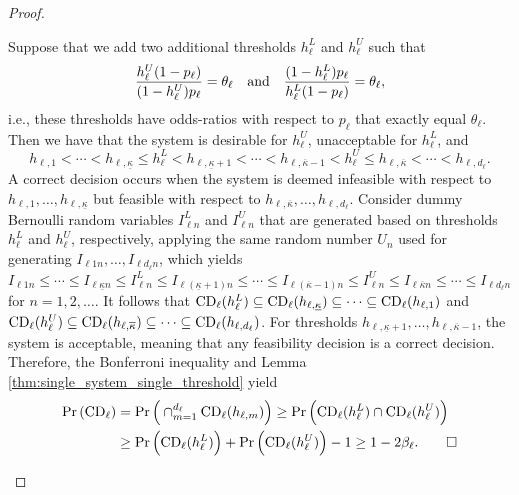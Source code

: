 \documentclass[11pt]{article}
\begin{document}
\begin{proof}
\begin{itemize}
Suppose that we add two additional thresholds $h_\ell^L$ and $h_\ell^U$ such that 
\begin{equation} 
\label{eqn:LBUB}
\frac{h_\ell^U (1-p_\ell)}{(1-h_\ell^U)p_\ell}  = \theta_\ell \quad \mbox{and} \quad {(1-h_\ell^L)p_\ell \over h_\ell^L(1-p_\ell)} =\theta_\ell,
\end{equation}
i.e., these thresholds have odds-ratios with respect to $p_\ell$ that exactly equal $\theta_\ell$. Then we have that the system is desirable for $h_\ell^U$, unacceptable for $h_\ell^L$, and 
\[
h_{\ell, 1} < \cdots < h_{\ell, \underline{\kappa}} \le h_\ell^L < h_{\ell,\underline{\kappa}+1} < \cdots < h_{\ell,\overline{\kappa}-1} < h_\ell^U \le h_{\ell,\overline{\kappa}} < \cdots < h_{\ell,d_\ell}.
\]
A correct decision occurs when the system is deemed infeasible with respect to $h_{\ell,1}, \ldots, h_{\ell,\underline{\kappa}}$ but feasible with respect to $h_{\ell,\overline{\kappa}}, \ldots, h_{\ell,d_\ell}$. Consider dummy Bernoulli random variables $I_{\ell n}^{L}$ and $I_{\ell n}^{U}$ that are generated based on thresholds $h_\ell^{L}$ and $h_\ell^{U}$, respectively, applying the same random number $U_{n}$ used for generating $I_{\ell 1n},\ldots, I_{\ell d_\ell n}$, which yields $I_{\ell 1n}\leq \cdots\leq I_{\ell \underline{\kappa} n}\leq I_{\ell n}^L\leq I_{\ell (\underline{\kappa}+1) n}\leq \cdots \leq I_{\ell (\overline{\kappa}-1) n}\leq I_{\ell n}^U \leq I_{\ell \overline{\kappa} n}\leq \cdots \leq I_{\ell d_\ell n}$ for $n=1,2,\ldots$.
It follows that ${\rm CD}_\ell(h_\ell^{L}) \subseteq {\rm CD}_\ell(h_{\ell, \underline{\kappa}})  \subseteq \cdots  \subseteq {\rm CD}_\ell(h_{\ell,1})$ and ${\rm CD}_\ell(h_\ell^{U}) \subseteq {\rm CD}_\ell(h_{\ell,\overline{\kappa}}) \subseteq \cdots \subseteq  {\rm CD}_{\ell}(h_{\ell,d_\ell})$. For thresholds $h_{\ell,\underline{\kappa}+1}, \ldots, h_{ \ell, \overline{\kappa}-1}$, the system is acceptable, meaning that any feasibility decision is a correct decision. Therefore, the Bonferroni inequality and Lemma \ref{thm:single_system_single_threshold} yield
\begin{align*}
\Pr\left( {\rm CD}_\ell \right)  &= \Pr\Big(\cap_{m=1}^{d_\ell} {\rm CD}_\ell(h_{\ell, m})\Big) 
\geq \Pr\Big( {\rm CD}_\ell(h_\ell^{L}) \cap {\rm CD}_\ell(h_\ell^{U})\Big) \\
&\ge \Pr\Big( {\rm CD}_\ell(h_\ell^{L})\Big) + \Pr\Big({\rm CD}_\ell(h_\ell^{U})\Big) -1 \ge 1 - 2\beta_\ell. \tag*{$\square$}
\end{align*}
\end{itemize}
\end{proof}
\end{document}
